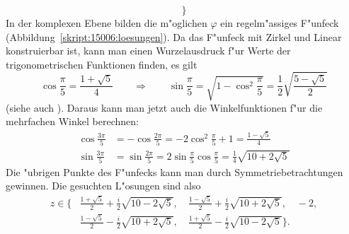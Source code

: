 \begin{loesung}
\[\biggr\}
\]
In der komplexen Ebene bilden die m"oglichen $\varphi$ ein regelm"assiges
F"unfeck (Abbildung~\ref{skript:15006:loesungen}).
Da das F"unfeck mit Zirkel und Linear konstruierbar ist, kann man
einen Wurzelausdruck f"ur Werte der trigonometrischen Funktionen 
finden, es gilt
\[
\cos\frac{\pi}{5}=\frac{1+\sqrt{5}}4
\qquad
\Rightarrow
\qquad
\sin\frac{\pi}5
=
\sqrt{1-\cos^2\frac{\pi}5}
=
\frac12\sqrt{\frac{5-\sqrt{5}}2}
\]
(siehe auch \cite{skript:pentagon}).
Daraus kann man jetzt auch die Winkelfunktionen f"ur die mehrfachen
Winkel berechnen:
\begin{align*}
\cos\frac{3\pi}5
&=
-\cos\frac{2\pi}5
=
-2\cos^2\frac{\pi}5+1
=
\frac{1-\sqrt{5}}4
\\
\sin\frac{3\pi}5
&=
\sin\frac{2\pi}5
=
2\sin\frac{\pi}5\cos\frac{\pi}5
=
\frac14\sqrt{10+2\sqrt{5}}
\end{align*}
Die "ubrigen Punkte des F"unfecks kann man durch Symmetriebetrachtungen
gewinnen.
Die gesuchten L"osungen sind also
\begin{align*}
z
\in
\biggl\{
&
\frac{1+\sqrt{5}}2+\frac{i}2\sqrt{10-2\sqrt{5}},\quad
\frac{1-\sqrt{5}}2 + \frac{i}2\sqrt{10+2\sqrt{5}},\quad
-2,
\\
&
\frac{1-\sqrt{5}}2 - \frac{i}2\sqrt{10+2\sqrt{5}},\quad
\frac{1+\sqrt{5}}2-\frac{i}2\sqrt{10-2\sqrt{5}}
\biggr\}.
\end{align*}
\end{loesung}

